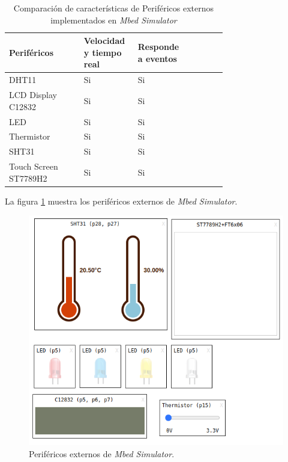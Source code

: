 \begin{table}[h]
\centering
\caption[Comparación de características de Periféricos externos implementados en \textit{Mbed Simulator}]{Comparación de características de Periféricos externos implementados en \textit{Mbed Simulator}}
\begin{tabular}{p{0.30\linewidth} p{0.14\linewidth}  p{0.14\linewidth}  p{0.14\linewidth}}
\toprule
\textbf{Periféricos} 
& \textbf{Velocidad y tiempo real}
& \textbf{Responde a eventos}
\\
\midrule
DHT11 & Si & Si  \\
LCD Display C12832 & Si & Si  \\
LED & Si & Si \\
Thermistor & Si & Si \\
SHT31 & Si & Si \\
Touch Screen ST7789H2 & Si & Si \\
\bottomrule
\hline
\end{tabular}
\label{tab:perifericosExternosMBED}
\end{table}


La figura \ref{fig:perifericosMbed} muestra los periféricos externos de \textit{Mbed Simulator}.


\begin{figure}[ht]
	\centering
	\includegraphics[scale=.81]{./Figures/perifericosMBED.png}
	\caption{Periféricos externos de \textit{Mbed Simulator}.}
	\label{fig:perifericosMbed}
\end{figure}


